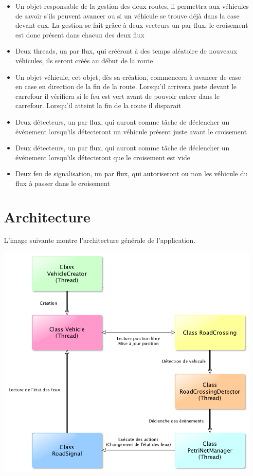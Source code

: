 \documentclass[11pt,a4paper, openany]{memoir}
\begin{document}
\begin{itemize}
\item Un objet responsable de la gestion des deux routes, il permettra aux véhicules de savoir s'ils peuvent avancer ou si un véhicule se trouve déjà dans la case devant eux. La gestion se fait grâce à deux vecteurs un par flux, le croisement est donc présent dans chacun des deux flux
\item Deux threads, un par flux, qui crééront à des temps aléatoire de nouveaux véhicules, ils seront créés au début de la route
\item Un objet véhicule, cet objet, dès sa création, commencera à avancer de case en case en direction de la fin de la route. Lorsqu'il arrivera juste devant le carrefour il vérifiera si le feu est vert avant de pouvoir entrer dans le carrefour. Lorsqu'il atteint la fin de la route il disparait
\item Deux détecteurs, un par flux, qui auront comme tâche de déclencher un événement lorsqu'ils détecteront un véhicule présent juste avant le croisement
\item Deux détecteurs, un par flux, qui auront comme tâche de déclencher un événement lorsqu'ils détecteront que le croisement est vide
\item Deux feu de signalisation, un par flux, qui autoriseront ou non les véhicule du flux à passer dans le croisement
\end{itemize}

\chapter{Architecture}

L'image suivante montre l'architecture générale de l'application.

\includegraphics[scale=0.5]{images/architecture.png}
\end{document}
